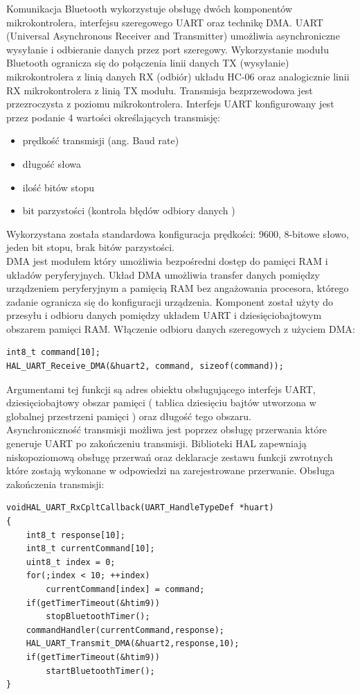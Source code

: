 \documentclass[eng,printmode]{mgr}
\begin{document}
Komunikacja Bluetooth wykorzystuje obsługę dwóch komponentów mikrokontrolera, interfejsu szeregowego UART oraz technikę DMA. UART (Universal Asynchronous Receiver and Transmitter) umożliwia asynchroniczne wysyłanie i odbieranie danych przez port szeregowy. Wykorzystanie modułu Bluetooth ogranicza się do połączenia linii danych  TX (wysyłanie) mikrokontrolera z linią danych RX (odbiór) układu HC-06 oraz analogicznie linii RX mikrokontrolera z linią TX modułu. Transmisja bezprzewodowa jest przezroczysta z poziomu mikrokontrolera. Interfejs UART konfigurowany jest przez podanie 4 wartości określających transmisję:
\begin{itemize}
  \item prędkość transmisji (ang. Baud rate)
  \item długość słowa
  \item ilość bitów stopu
  \item bit parzystości (kontrola błędów odbiory danych )
\end{itemize}
Wykorzystana została standardowa konfiguracja prędkości: 9600, 8-bitowe słowo, jeden bit stopu, brak bitów parzystości.
\\DMA jest modułem który umożliwia bezpośredni dostęp do pamięci RAM i układów peryferyjnych. Układ DMA umożliwia transfer danych pomiędzy urządzeniem peryferyjnym a pamięcią RAM bez angażowania procesora, którego zadanie ogranicza się do konfiguracji urządzenia. Komponent został użyty do przesyłu i odbioru danych pomiędzy układem UART i dziesięciobajtowym obszarem pamięci RAM. Włączenie odbioru danych szeregowych z użyciem DMA:
\begin{lstlisting}[style=c]
int8_t command[10];
HAL_UART_Receive_DMA(&huart2, command, sizeof(command));
\end{lstlisting}
Argumentami tej funkcji są adres obiektu obsługującego interfejs UART, dziesięciobajtowy obszar pamięci ( tablica dziesięciu bajtów utworzona w globalnej przestrzeni pamięci ) oraz długość tego obszaru. 
\\Asynchroniczność transmisji możliwa jest poprzez obsługę przerwania które generuje UART po zakończeniu transmisji. Biblioteki HAL zapewniają niskopoziomową obsługę przerwań oraz deklaracje zestawu funkcji zwrotnych które zostają wykonane w odpowiedzi na zarejestrowane przerwanie. Obsługa zakończenia transmisji:
\begin{lstlisting}[style=c]
voidHAL_UART_RxCpltCallback(UART_HandleTypeDef *huart)
{
	int8_t response[10];
	int8_t currentCommand[10];
	uint8_t index = 0;
	for(;index < 10; ++index)
		currentCommand[index] = command;
	if(getTimerTimeout(&htim9))
		stopBluetoothTimer();
	commandHandler(currentCommand,response);
	HAL_UART_Transmit_DMA(&huart2,response,10);
	if(getTimerTimeout(&htim9))
		startBluetoothTimer();
}
\end{lstlisting}
\end{document}
